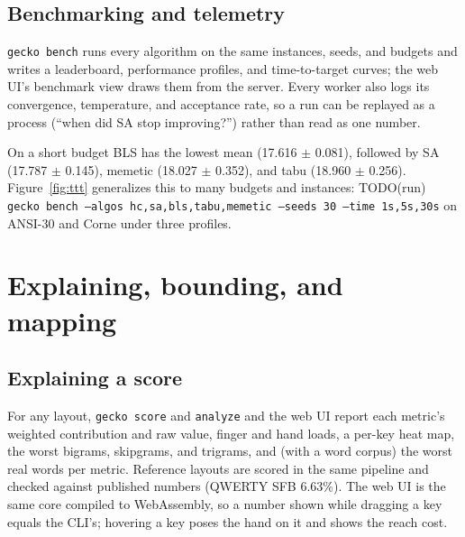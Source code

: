 \documentclass{gecko-paper}
\begin{document}
\begin{paperbody}
\subsection{Benchmarking and telemetry}
\texttt{gecko bench} runs every algorithm on the same instances, seeds, and budgets and writes a leaderboard, performance profiles, and time-to-target curves; the web UI's benchmark view draws them from the server. Every worker also logs its convergence, temperature, and acceptance rate, so a run can be replayed as a process (``when did SA stop improving?'') rather than read as one number.


On a short budget BLS has the lowest mean (17.616 $\pm$ 0.081), followed by SA (17.787 $\pm$ 0.145), memetic (18.027 $\pm$ 0.352), and tabu (18.960 $\pm$ 0.256). Figure~\ref{fig:ttt} generalizes this to many budgets and instances: TODO(run) \texttt{gecko bench --algos hc,sa,bls,tabu,memetic --seeds 30 --time 1s,5s,30s} on ANSI-30 and Corne under three profiles.


\section{Explaining, bounding, and mapping}\label{sec:analysis}
\subsection{Explaining a score}\label{sec:explain}
For any layout, \texttt{gecko score} and \texttt{analyze} and the web UI report each metric's weighted contribution and raw value, finger and hand loads, a per-key heat map, the worst bigrams, skipgrams, and trigrams, and (with a word corpus) the worst real words per metric. Reference layouts are scored in the same pipeline and checked against published numbers (QWERTY SFB 6.63\%). The web UI is the same core compiled to WebAssembly, so a number shown while dragging a key equals the CLI's; hovering a key poses the hand on it and shows the reach cost.


\end{paperbody}
\end{document}

